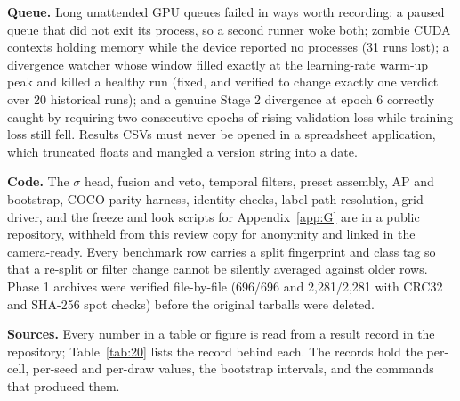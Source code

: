 \documentclass[10pt]{article}
\begin{document}
\textbf{Queue.} Long unattended GPU queues failed in ways worth recording: a paused queue that did not exit its process, so a second runner woke both; zombie CUDA contexts holding memory while the device reported no processes (31 runs lost); a divergence watcher whose window filled exactly at the learning-rate warm-up peak and killed a healthy run (fixed, and verified to change exactly one verdict over 20 historical runs); and a genuine Stage 2 divergence at epoch 6 correctly caught by requiring two consecutive epochs of rising validation loss while training loss still fell. Results CSVs must never be opened in a spreadsheet application, which truncated floats and mangled a version string into a date.

\textbf{Code.} The $\sigma$ head, fusion and veto, temporal filters, preset assembly, AP and bootstrap, COCO-parity harness, identity checks, label-path resolution, grid driver, and the freeze and look scripts for Appendix~\ref{app:G} are in a public repository, withheld from this review copy for anonymity and linked in the camera-ready. Every benchmark row carries a split fingerprint and class tag so that a re-split or filter change cannot be silently averaged against older rows. Phase 1 archives were verified file-by-file (696/696 and 2,281/2,281 with CRC32 and SHA-256 spot checks) before the original tarballs were deleted.

\textbf{Sources.} Every number in a table or figure is read from a result record in the repository; Table~\ref{tab:20} lists the record behind each. The records hold the per-cell, per-seed and per-draw values, the bootstrap intervals, and the commands that produced them.
\end{document}
